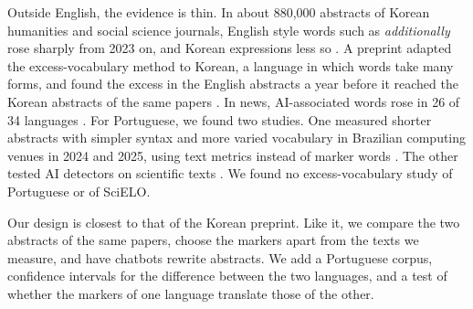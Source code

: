 \documentclass[12pt]{article}
\newcommand{\w}[1]{\textit{#1}}
\begin{document}
Outside English, the evidence is thin. In about 880,000 abstracts of Korean humanities and social
science journals, English style words such as \w{additionally} rose sharply from 2023 on, and
Korean expressions less so \cite{koo2026lexical}. A preprint adapted the excess-vocabulary method to
Korean, a language in which words take many forms, and found the excess in the English abstracts a
year before it reached the Korean abstracts of the same papers \cite{lee2026korean}. In news,
AI-associated words rose in 26 of 34 languages \cite{juzek2026crosslingual}. For Portuguese, we
found two studies. One measured shorter abstracts with simpler syntax and more varied vocabulary in
Brazilian computing venues in 2024 and 2025, using text metrics instead of marker words
\cite{lobo2026evolucao}. The other tested AI detectors on scientific texts
\cite{candido2025analise}. We found no excess-vocabulary study of Portuguese or of SciELO.

Our design is closest to that of the Korean preprint. Like it, we compare the two abstracts of the
same papers, choose the markers apart from the texts we measure, and have chatbots rewrite
abstracts. We add a Portuguese corpus, confidence intervals for the difference between the two
languages, and a test of whether the markers of one language translate those of the other.
\end{document}
